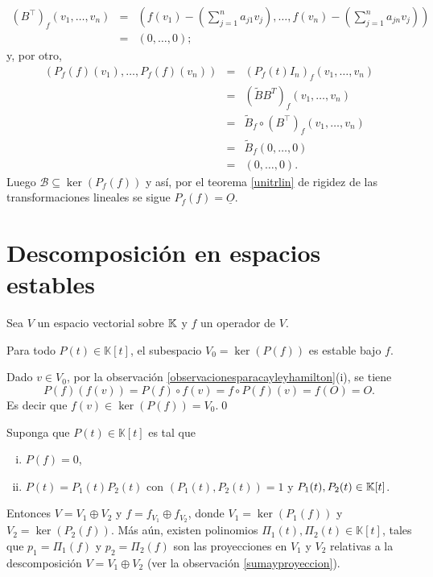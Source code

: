 \begin{obs}
\begin{eqnarray*}
\left(B^\intercal\right)_f(v_1,\ldots, v_n)& = & \left(f(v_1)-\left(\sum_{j=1}^na_{j1}v_j\right),\ldots, f(v_n)-\left(\sum_{j=1}^na_{jn}v_j\right)\right)\\
   & = & \left(0,\ldots, 0\right);
\end{eqnarray*}
y, por otro,
\begin{eqnarray*}
\left(P_f(f)(v_1),\ldots, P_f(f)(v_n)\right) & = & \left(P_f(t)I_n\right)_f(v_1,\ldots,v_n)\\
    & = & \left( \tilde{B}B^T \right)_f (v_1,\ldots, v_n)\\
    & = & \tilde{B}_f\circ\left(B^\intercal\right)_f(v_1,\ldots,v_n)\\
    & = & \tilde{B}_f(0,\ldots, 0)\\
    & = & (0,\ldots, 0).
\end{eqnarray*}
Luego $\mathcal{B}\subseteq \ker\left(P_f(f)\right)$ y as\'i, por el teorema \ref{unitrlin} de rigidez de las transformaciones lineales se sigue $P_f(f)=\underline{O}$.
\end{obs}

\section{Descomposición en espacios estables}

Sea $V$ un espacio vectorial sobre $\mathbb{K}$ y $f$ un operador de $V$.

\begin{prop}
Para todo $P(t)\in \mathbb{K}[t]$, el subespacio $V_0=\ker\left(P(f)\right)$ es estable bajo $f$.
\end{prop}

\dem Dado $v\in V_0$, por la observación \ref{observacionesparacayleyhamilton}(i), se tiene
$$P(f)\left(f(v)\right)=P(f)\circ f(v)=f\circ P(f)(v)=f(O)=O.$$
Es decir que $f(v)\in\ker\left(P(f)\right)=V_0$.\qed

\begin{prop}
Suponga que $P(t)\in \mathbb{K}[t]$ es tal que
\begin{enumerate}[(i)]
  \item $P(f)=0$,
  \item $P(t)=P_1(t)P_2(t)$ con $\left(P_1(t),P_2(t)\right)=1$ y $P_1(t),P_2(t)\in\mathbb{K}[t]$.
\end{enumerate}
Entonces $V=V_1\oplus V_2$ y $f=f_{V_1}\oplus f_{V_2}$, donde $V_1=\ker\left(P_1(f)\right)$ y $V_2=\ker\left(P_2(f)\right)$. M\'as a\'un, existen polinomios $\Pi_1(t),\Pi_2(t)\in \mathbb{K}[t]$, tales que $p_1=\Pi_1(f)$ y $p_2=\Pi_2(f)$ son las proyecciones en $V_1$ y $V_2$ relativas a la descomposición $V=V_1\oplus V_2$ (ver la observación \ref{sumayproyeccion}).
\end{prop}

